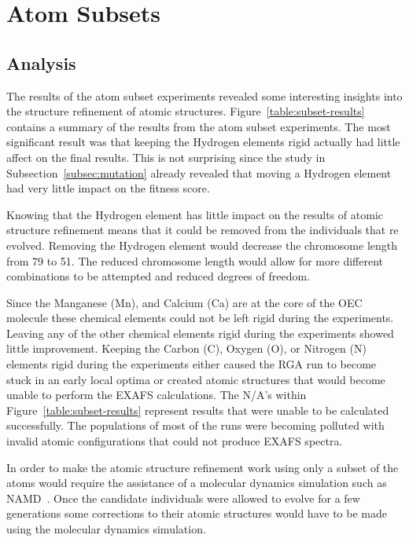 \section{Atom Subsets}

\subsection{Analysis}

The results of the atom subset experiments revealed some interesting insights into the structure refinement of atomic structures. Figure~\ref{table:subset-results} contains a summary of the results from the atom subset experiments. The most significant result was that keeping the Hydrogen elements rigid actually had little affect on the final results. This is not surprising since the study in Subsection~\ref{subsec:mutation} already revealed that moving a Hydrogen element had very little impact on the fitness score.

Knowing that the Hydrogen element has little impact on the results of atomic structure refinement means that it could be removed from the individuals that re evolved. Removing the Hydrogen element would decrease the chromosome length from 79 to 51. The reduced chromosome length would allow for more different combinations to be attempted and reduced degrees of freedom.

Since the Manganese (Mn), and Calcium (Ca) are at the core of the OEC molecule these chemical elements could not be left rigid during the experiments. Leaving any of the other chemical elements rigid during the experiments showed little improvement. Keeping the Carbon (C), Oxygen (O), or Nitrogen (N) elements rigid during the experiments either caused the RGA run to become stuck in an early local optima or created atomic structures that would become unable to perform the EXAFS calculations. The N/A's within Figure~\ref{table:subset-results} represent results that were unable to be calculated successfully. The populations of most of the runs were becoming polluted with invalid atomic configurations that could not produce EXAFS spectra.

In order to make the atomic structure refinement work using only a subset of the atoms would require the assistance of a molecular dynamics simulation such as NAMD~\cite{namd}. Once the candidate individuals were allowed to evolve for a few generations some corrections to their atomic structures would have to be made using the molecular dynamics simulation.

